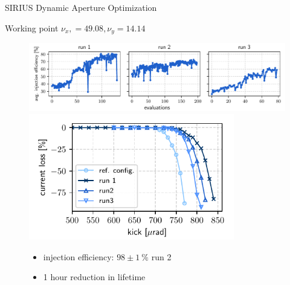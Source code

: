 \documentclass[aspectratio=169]{beamer}
\begin{document}
\begin{frame}{SIRIUS Dynamic Aperture Optimization}
    \begin{minipage}{0.55\textwidth}
        Working point $\nu_x, = 49.08, \nu_y = 14.14$
        \begin{figure}
            \centering
            \includegraphics[width=\textwidth]{oldtunes_history.pdf}
            \includegraphics[width = 0.8\textwidth]{WEPL087_f1.pdf}
            \vfill
            \begin{itemize}
                \item injection efficiency: $98\pm1~\%$ run 2
                \item 1 hour reduction in lifetime
            \end{itemize}
        \end{figure}
    \end{minipage}
    \hfill
    \begin{minipage}{0.44\textwidth}
        \begin{figure}
            \centering

\end{figure}
\end{minipage}
\end{frame}
\end{document}
